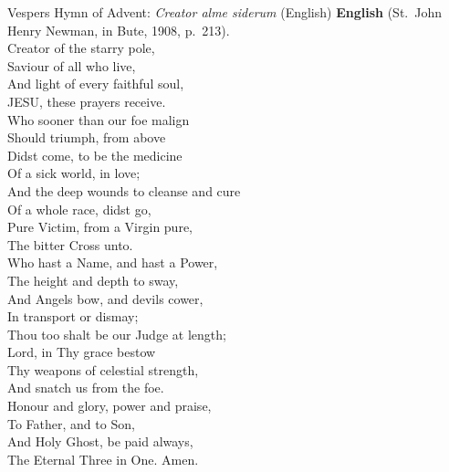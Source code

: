 \begin{massbox}{Vespers Hymn of Advent: \textit{Creator alme siderum} (English)}
\textbf{English} (St.~John Henry Newman, in Bute, 1908, p.~213).\\
Creator of the starry pole,\\
Saviour of all who live,\\
And light of every faithful soul,\\
JESU, these prayers receive.\\[0.4em]
Who sooner than our foe malign\\
Should triumph, from above\\
Didst come, to be the medicine\\
Of a sick world, in love;\\[0.4em]
And the deep wounds to cleanse and cure\\
Of a whole race, didst go,\\
Pure Victim, from a Virgin pure,\\
The bitter Cross unto.\\[0.4em]
Who hast a Name, and hast a Power,\\
The height and depth to sway,\\
And Angels bow, and devils cower,\\
In transport or dismay;\\[0.4em]
Thou too shalt be our Judge at length;\\
Lord, in Thy grace bestow\\
Thy weapons of celestial strength,\\
And snatch us from the foe.\\[0.4em]
Honour and glory, power and praise,\\
To Father, and to Son,\\
And Holy Ghost, be paid always,\\
The Eternal Three in One. Amen.
\end{massbox}

